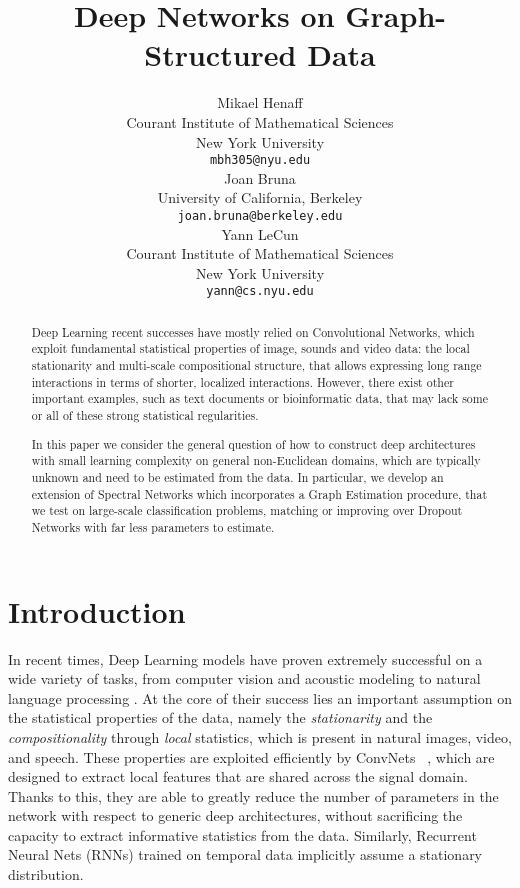 \documentclass{article} %
\title{Deep Networks on Graph-Structured Data}
\author{
Mikael Henaff \\
Courant Institute of Mathematical Sciences\\
New York University\\
\texttt{mbh305@nyu.edu} \\
\And
Joan Bruna \\
University of California, Berkeley \\
\texttt{joan.bruna@berkeley.edu} \\
\AND
Yann LeCun \\
Courant Institute of Mathematical Sciences \\
New York University \\
\texttt{yann@cs.nyu.edu} \\
}
\begin{document}
\maketitle

\begin{abstract}
Deep Learning recent successes have mostly relied on Convolutional Networks, which exploit fundamental statistical properties of image, sounds and video data: the local stationarity and multi-scale compositional structure, that allows expressing long range interactions in terms of shorter, localized interactions. However, there exist other important examples, such as text documents or bioinformatic data, that may lack some or all of these strong statistical regularities. 

In this paper we consider the general question of how to construct deep architectures with small learning complexity on general non-Euclidean domains, which are typically unknown and need to be estimated from the data. In particular, we develop an extension of Spectral Networks which incorporates a Graph Estimation procedure, that we test on large-scale classification problems, matching or improving over Dropout Networks with far less parameters to estimate.
\end{abstract}

\section{Introduction}


In recent times, Deep Learning models have proven extremely successful on a wide variety of tasks, from computer vision and acoustic modeling to natural language processing \cite{natureyann}. At the core of their success lies an important assumption on the statistical properties of the data, namely the \emph{stationarity} and the \emph{compositionality} through \emph{local} statistics, which is present in natural images, video, and speech.
 These properties are exploited efficiently by ConvNets ~\cite{krizhevsky2012,hinton12}, which are designed to extract local features that are shared across the signal domain. Thanks to this, they are able to greatly reduce the number of parameters in the network with respect to generic deep architectures, without sacrificing the capacity to extract informative statistics from the data. Similarly, Recurrent Neural Nets (RNNs) trained on temporal data implicitly assume a stationary distribution.
\end{document}
